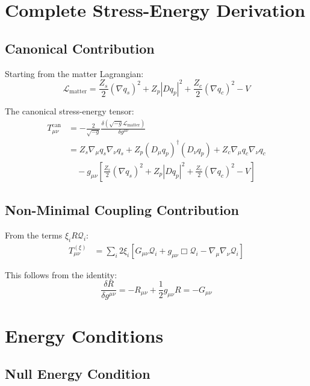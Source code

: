 \documentclass[openany]{memoir}
\theoremstyle{definition}
\theoremstyle{plain}
\theoremstyle{remark}
\newcommand{\Tcan}{T^{\text{can}}}
\newcommand{\Txi}{T^{(\xi)}}
\begin{document}
\appendix

\chapter{Complete Stress-Energy Derivation}
\label{app:stress_tensor}

\section{Canonical Contribution}

Starting from the matter Lagrangian:
\begin{equation}
\mathcal{L}_{\text{matter}} = \frac{Z_s}{2}(\nabla q_s)^2 + Z_p |Dq_p|^2 + \frac{Z_c}{2}(\nabla q_c)^2 - V
\end{equation}

The canonical stress-energy tensor:
\begin{align}
\Tcan_{\mu\nu} &= -\frac{2}{\sqrt{-g}}\frac{\delta(\sqrt{-g}\mathcal{L}_{\text{matter}})}{\delta g^{\mu\nu}} \\
&= Z_s \nabla_\mu q_s \nabla_\nu q_s + Z_p (D_\mu q_p)^\dagger (D_\nu q_p) + Z_c \nabla_\mu q_c \nabla_\nu q_c \\
&\quad - g_{\mu\nu}\left[\frac{Z_s}{2}(\nabla q_s)^2 + Z_p |Dq_p|^2 + \frac{Z_c}{2}(\nabla q_c)^2 - V\right]
\end{align}

\section{Non-Minimal Coupling Contribution}

From the terms $\xi_i R \mathcal{Q}_i$:
\begin{align}
\Txi_{\mu\nu} &= \sum_i 2\xi_i \left[G_{\mu\nu} \mathcal{Q}_i + g_{\mu\nu} \Box \mathcal{Q}_i - \nabla_\mu \nabla_\nu \mathcal{Q}_i\right]
\end{align}

This follows from the identity:
\begin{equation}
\frac{\delta R}{\delta g^{\mu\nu}} = -R_{\mu\nu} + \frac{1}{2}g_{\mu\nu}R = -G_{\mu\nu}
\end{equation}

\chapter{Energy Conditions}
\label{app:energy}

\section{Null Energy Condition}
\end{document}
